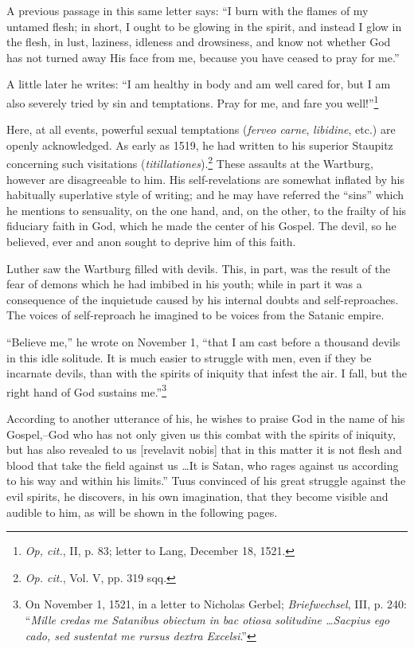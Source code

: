 A previous passage in this same letter says: “I burn with the flames of
my untamed flesh; in short, I ought to be glowing in the spirit, and instead
I glow in the flesh, in lust, laziness, idleness and drowsiness, and know not
whether God has not turned away His face from me, because you have
ceased to pray for me.”

A little later he writes: “I am healthy in body and am well cared for, but
I am also severely tried by sin and temptations. Pray for me, and fare you
well!”\footnote{\textit{Op, cit.}, II, p. 83; letter to Lang, December 18, 1521.}

Here, at all events, powerful sexual temptations (\textit{ferveo carne},
\textit{libidine}, etc.) are openly acknowledged. As early as 1519, he had
written to his superior Staupitz concerning such visitations (\textit{titillationes}).\footnote
{\textit{Op. cit.}, Vol. V, pp. 319 sqq.}
These assaults at the Wartburg, however are disagreeable
to him. His self-revelations are somewhat inflated by his habitually
superlative style of writing; and he may have referred the “sins”
which he mentions to sensuality, on the one hand, and, on the other,
to the frailty of his fiduciary faith in God, which he made the center
of his Gospel. The devil, so he believed, ever and anon sought to deprive
him of this faith.

Luther saw the Wartburg filled with devils. This, in part, was the
result of the fear of demons which he had imbibed in his youth; while
in part it was a consequence of the inquietude caused by his internal
doubts and self-reproaches. The voices of self-reproach he imagined
to be voices from the Satanic empire.

“Believe me,” he wrote on November 1, “that I am cast before a thousand
devils in this idle solitude. It is much easier to struggle with men, even if
they be incarnate devils, than with the spirits of iniquity that infest the air.
I fall, but the right hand of God sustains me.”\footnote
{On November 1, 1521, in a letter to Nicholas Gerbel; \textit{Briefwechsel}, III, p. 240: ``\textit{Mille
credas me Satanibus obiectum in bac otiosa solitudine \dots Sacpius ego cado, sed sustentat
me rursus dextra Excelsi}.”}

According to another utterance of his, he wishes to praise God in the
name of his Gospel,--God who has not only given us this combat with the
spirits of iniquity, but has also revealed to us [revelavit nobis] that in this
matter it is not flesh and blood that take the field against us \dots It is
Satan, who rages against us according to his way and within his limits.”
Tuus convinced of his great struggle against the evil spirits, he discovers,
in his own imagination, that they become visible and audible to him, as
will be shown in the following pages.

